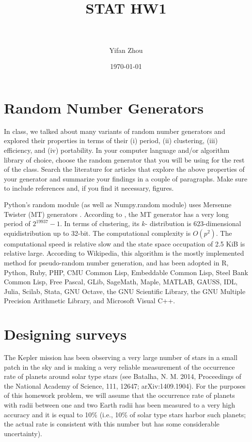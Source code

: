 \documentclass[paper=letter, fontsize=11pt]{scrartcl} %
\title{ 
  \normalfont \normalsize 
  \textsc{} \\ [25pt] %
  \horrule{0.5pt} \\ [0.4cm] %
  \huge STAT HW1 \\ %
  \horrule{2pt} \\ [0.5cm] %
}
\author{Yifan Zhou} %
\date{\normalsize\today} %
\numberwithin{equation}{section} %
\numberwithin{figure}{section} %
\numberwithin{table}{section} %
\begin{document}
\maketitle %
\section{Random Number Generators}
{In class, we talked about many variants of random number generators
and explored their properties in terms of their (i) period, (ii)
clustering, (iii) efficiency, and (iv) portability. In your computer
language and/or algorithm library of choice, choose the random
generator that you will be using for the rest of the class. Search the
literature for articles that explore the above properties of your
generator and summarize your findings in a couple of paragraphs. Make
sure to include references and, if you find it necessary, figures.}

Python's random module (as well as Numpy.random module) uses Mersenne
Twister (MT) generators \citep{MT1998}. According to \cite{MT1998},
the MT generator has a very long period of $2^{19937} -1$. In terms of
clustering, its $k$- distribution is 623-dimensional equidistribution
up to 32-bit. The computational complexity is $O(p^{2})$. The
computational speed is relative slow and the state space occupation of
2.5 KiB is relative large. According to Wikipedia, this algorithm is
the mostly implemented method for pseudo-random number generation, and
has been adopted in R, Python, Ruby, PHP, CMU Common
Lisp, Embeddable Common Lisp, Steel Bank Common Lisp, Free
Pascal, GLib, SageMath, Maple, MATLAB, GAUSS,
IDL, Julia, Scilab, Stata, GNU Octave, the GNU
Scientific Library, the GNU Multiple Precision Arithmetic
Library, and Microsoft Visual C++.

\section{Designing surveys}
The Kepler mission has been observing a very large number of stars in
a small patch in the sky and is making a very reliable measurement of
the occurrence rate of planets around solar type stars (see Batalha,
N. M. 2014, Proceedings of the National Academy of Science, 111,
12647; arXiv:1409.1904). For the purposes of this homework problem, we
will assume that the occurrence rate of planets with radii between one
and two Earth radii has been measured to a very high accuracy and it
is equal to 10\% (i.e., 10\% of solar type stars harbor such planets;
the actual rate is consistent with this number but has some
considerable uncertainty).
\end{document}
